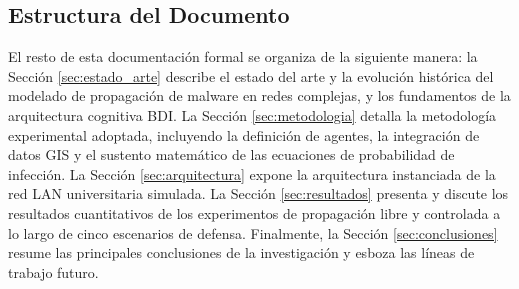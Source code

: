 \subsection{Estructura del Documento}
El resto de esta documentación formal se organiza de la siguiente manera: la Sección \ref{sec:estado_arte} describe el estado del arte y la evolución histórica del modelado de propagación de malware en redes complejas, y los fundamentos de la arquitectura cognitiva BDI. La Sección \ref{sec:metodologia} detalla la metodología experimental adoptada, incluyendo la definición de agentes, la integración de datos GIS y el sustento matemático de las ecuaciones de probabilidad de infección. La Sección \ref{sec:arquitectura} expone la arquitectura instanciada de la red LAN universitaria simulada. La Sección \ref{sec:resultados} presenta y discute los resultados cuantitativos de los experimentos de propagación libre y controlada a lo largo de cinco escenarios de defensa. Finalmente, la Sección \ref{sec:conclusiones} resume las principales conclusiones de la investigación y esboza las líneas de trabajo futuro.
